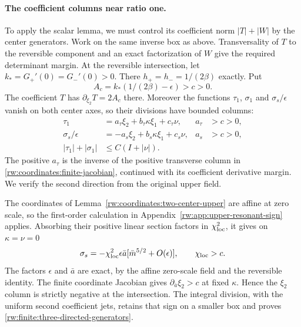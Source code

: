 \paragraph{The coefficient columns near ratio one.}
To apply the scalar lemma, we must control its coefficient norm
$|T|+|W|$ by the center generators. Work on the same inverse box
as above. Transversality of $T$ to the reversible component and an
exact factorization of $W$ give the required determinant margin.
At the reversible intersection, let $k_*=G_+'(0)=G_-'(0)>0$.
There $h_+=h_-=1/(2\beta)$ exactly. Put
\[
 A_c=k_*(1/(2\beta)-\epsilon)>c>0.
\]
The coefficient $T$ has $\partial_{\xi_2}T=2A_c$ there.
Moreover the functions $\tau_1$, $\sigma_1$ and $\sigma_s/\epsilon$
vanish on both center axes, so their divisions have bounded columns:
\begin{equation}\label{rw:finite:three-directed-generators}
\begin{aligned}
 \tau_1&=a_\tau\xi_2+b_\tau\kappa\xi_1+c_\tau\nu,
                         &a_\tau&>c>0,\\
 \sigma_s/\epsilon&=-a_s\xi_2+b_s\kappa\xi_1+c_s\nu,
                         &a_s&>c>0,\\
 |\tau_1|+|\sigma_1|&\le C(I+|\nu|).
\end{aligned}
\end{equation}
The positive $a_\tau$ is the inverse of the positive transverse
column in \eqref{rw:coordinates:finite-jacobian}, continued with
its coefficient derivative margin. We verify the second direction
from the original upper field.

The coordinates of Lemma~\ref{rw:coordinates:two-center-upper}
are affine at zero scale, so the first-order calculation in
Appendix~\ref{rw:app:upper-resonant-sign} applies. Absorbing their
positive linear section factors in $\chi_{\rm loc}^2$, it gives on
$\kappa=\nu=0$
\[
 \sigma_s=-\chi_{\rm loc}^2\epsilon\bar a
                  [\bar m^{5/2}+O(\epsilon)],\qquad\chi_{\rm loc}>c.
\]
The factors $\epsilon$ and $\bar a$ are exact, by the affine
zero-scale field and the reversible identity. The finite coordinate
Jacobian gives $\partial_{\bar a}\xi_2>c$ at fixed $\kappa$.
Hence the $\xi_2$ column is strictly negative at the intersection.
The integral division, with the uniform second coefficient jets,
retains that sign on a smaller box and proves
\eqref{rw:finite:three-directed-generators}.

